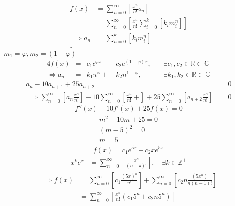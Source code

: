 \documentclass{article}
\begin{document}
\begin{align}
    f{\left({ x }\right)} &= \sum^{\infty}_{n= 0}   {\left[{  \frac{x^n}{n!} a_n }\right]} \nonumber \\
&= \sum^{\infty}_{n= 0} {\left[{ \frac{x^n}{n!}  \sum^{k}_{i=0}   {\left[{ k_im^n_i }\right]}  }\right]}  \nonumber \\
      \implies  a_n &= \sum^{k}_{n= 0} {\left[{ k_im_i^n }\right]}     \nonumber \\ \nonumber
\square
\end{align}
$m_1 = \varphi, m_2 = {\left({ 1-\varphi }\right)}$
\begin{alignat}{4}
    f{\left({ x }\right)} &= &c_1 e^{\varphi x} +  &c_2 e^{{\left({ 1-\varphi }\right)} x}, \quad &\exists c_1, c_2 \in \mathbb{R} \subset \mathbb{C} \nonumber \\
    \iff  a_n &= &k_1 n^{\varphi} +  &k_2 n^{1- \varphi}, &\exists k_1, k_2 \in \mathbb{R} \subset \mathbb{C} \nonumber
\end{alignat}
\begin{align}
    a_n -  10a_{n+ 1} +  25a_{n+  2}&= 0 \label{eq:hom-repeated-roots-recurrence} \\
    \implies  \sum^{\infty}_{n= 0}   {\left[{ a_n \frac{x^n}{n!} }\right]} - 10 \sum^{\infty}_{n= 0}   {\left[{ \frac{x^n}{n!}+    }\right]} + 25 \sum^{\infty}_{n= 0 }   {\left[{  a_{n+  2 }\frac{x^n}{n!} }\right]}&= 0 \nonumber
\end{align}
\begin{align}
    f''{\left({ x }\right)}- 10f'{\left({ x }\right)}+  25f{\left({ x }\right)}= 0 \nonumber \label{eq:rep-roots-func-ode}
\end{align}
\begin{align}
    m^2- 10m+  25 = 0 \nonumber \\
    {\left({ m- 5 }\right)}^2 = 0 \nonumber \\
    m= 5 \label{eq:rep-roots-recurrence-char-sol}
\end{align}
\begin{align}
    f{\left({ x }\right)}= c_1e^{5x} +  c_2 x e^{5x} \label{eq:rep-roots-ode-sol}
\end{align}
\begin{align}
    x^ke^x &= \sum^{\infty}_{n= 0}   {\left[{ \frac{x^n}{{\left({ n- k }\right)}!} }\right]}, \quad \exists k \in \mathbb{Z}^+ \label{eq:uniq-roots-pow-series-ident}
\end{align}
\begin{align}
    \implies  f{\left({ x }\right)} &= \sum^{\infty}_{n= 0}   {\left[{ c_1 \frac{{\left({ 5x }\right)}^n}{n!} }\right]}  +  \sum^{\infty}_{n= 0}   {\left[{ c_2 n \frac{{\left({ 5x^n }\right)}}{n{\left({ n-1 }\right)}!} }\right]} \nonumber \\
 &= \sum^{\infty}_{n= 0}   {\left[{ \frac{x^n}{n!} {\left({ c_{1}5^n +  c_2 n 5^n   }\right)} }\right]} \nonumber
\end{align}
\end{document}
